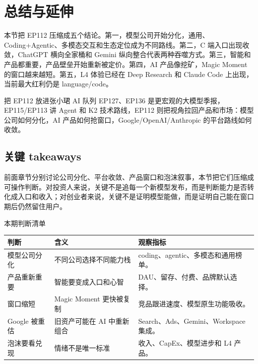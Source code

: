 \section{总结与延伸}

本节把 EP112 压缩成五个结论。第一，模型公司开始分化，通用、Coding+Agentic、多模态交互和生态定位成为不同路线。第二，C 端入口出现收敛，ChatGPT 横向全家桶和 Gemini 纵向整合代表两种吞噬方式。第三，智能和产品都重要，产品壁垒开始重新被定价。第四，AI 产品像挖矿，Magic Moment 的窗口越来越短。第五，L4 体验已经在 Deep Research 和 Claude Code 上出现，当前最大红利仍是 language/code。

\begin{importantbox}{把 EP112 放进张小珺 AI 队列}
EP127、EP136 是更宏观的大模型季报，EP115/EP113 讲 Agent 和 K2 技术路线，EP112 则把视角拉回产品和市场：模型公司如何分化，AI 产品如何抢窗口，Google/OpenAI/Anthropic 的平台路线如何收敛。
\end{importantbox}

\subsection{关键 takeaways}

前面章节分别讨论公司分化、平台收敛、产品窗口和泡沫叙事，本节把它们压缩成可操作判断。对投资人来说，关键不是追每一个新模型发布，而是判断能力是否转化成入口和收入；对创业者来说，关键不是证明模型能做，而是证明自己能在窗口期后仍然留住用户。

\begin{knowledgebox}{本期判断清单}
\begin{tabularx}{\textwidth}{p{}p{}X}
\toprule
判断 & 含义 & 观察指标 \\
\midrule
模型公司分化 & 不同公司选择不同能力栈 & coding、agentic、多模态和通用榜单。 \\
产品重新重要 & 智能要变成入口和心智 & DAU、留存、付费、品牌默认选择。 \\
窗口缩短 & Magic Moment 更快被复制 & 竞品跟进速度、模型原生功能吸收。 \\
Google 被重估 & 旧资产可能在 AI 中重新组合 & Search、Ads、Gemini、Workspace 集成。 \\
泡沫要看兑现 & 情绪不是唯一标准 & 收入、CapEx、模型进步和 L4 产品。 \\
\bottomrule
\end{tabularx}
\end{knowledgebox}

